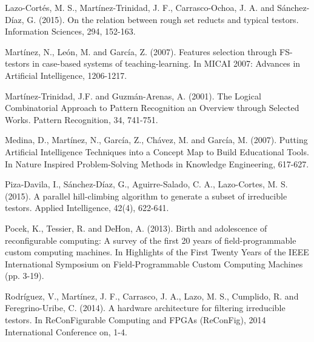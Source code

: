 \documentclass[authoryear,preprint,review,12pt]{elsarticle}
\begin{document}
\begin{thebibliography}{00}
Lazo-Cortés, M. S., Mart\'inez-Trinidad, J. F., Carrasco-Ochoa, J. A. and S\'anchez-D\'iaz, G. (2015). On the relation between rough set reducts and typical testors. Information Sciences, 294, 152-163.

Mart\'inez, N., Le\'on, M. and Garc\'ia, Z. (2007). Features selection through FS-testors in case-based systems of teaching-learning. In MICAI 2007: Advances in Artificial Intelligence, 1206-1217.

Mart\'inez-Trinidad, J.F. and Guzm\'an-Arenas, A. (2001). The Logical Combinatorial Approach to Pattern Recognition an Overview through Selected Works. Pattern Recognition, 34, 741-751.

Medina, D., Mart\'inez, N., Garc\'ia, Z., Ch\'avez, M. and Garc\'ia, M. (2007). Putting Artificial Intelligence Techniques into a Concept Map to Build Educational Tools. In Nature Inspired Problem-Solving Methods in Knowledge Engineering, 617-627.

Piza-Davila, I., S\'anchez-D\'iaz, G., Aguirre-Salado, C. A., Lazo-Cortes, M. S. (2015). A parallel hill-climbing algorithm to generate a subset of irreducible testors. Applied Intelligence, 42(4), 622-641.

Pocek, K., Tessier, R. and DeHon, A. (2013). Birth and adolescence of reconfigurable computing: A survey of the first 20 years of field-programmable custom computing machines. In Highlights of the First Twenty Years of the IEEE International Symposium on Field-Programmable Custom Computing Machines (pp. 3-19).

 Rodr\'iguez, V., Mart\'inez, J. F., Carrasco, J. A., Lazo, M. S., Cumplido, R. and Feregrino-Uribe, C. (2014). A hardware architecture for filtering irreducible testors. In ReConFigurable Computing and FPGAs (ReConFig), 2014 International Conference on, 1-4.


\end{thebibliography}
\end{document}
